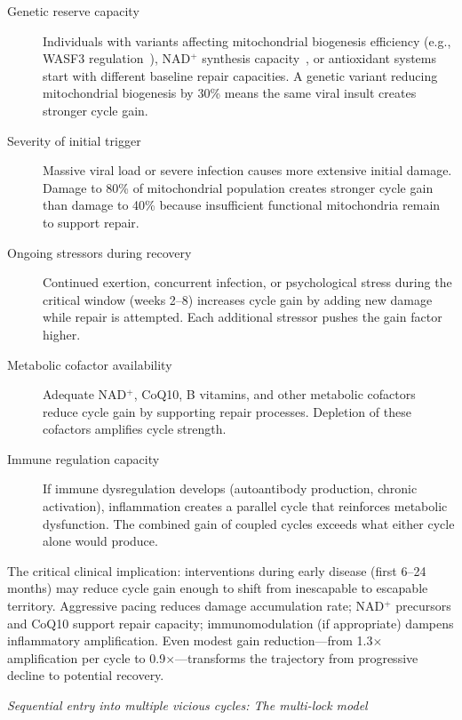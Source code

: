 \begin{description}
    \item[Genetic reserve capacity] Individuals with variants affecting mitochondrial biogenesis efficiency (e.g., WASF3 regulation~\cite{wang2023wasf3}), NAD$^+$ synthesis capacity~\cite{syed2025nad_therapy}, or antioxidant systems start with different baseline repair capacities. A genetic variant reducing mitochondrial biogenesis by 30\% means the same viral insult creates stronger cycle gain.

    \item[Severity of initial trigger] Massive viral load or severe infection causes more extensive initial damage. Damage to 80\% of mitochondrial population creates stronger cycle gain than damage to 40\% because insufficient functional mitochondria remain to support repair.

    \item[Ongoing stressors during recovery] Continued exertion, concurrent infection, or psychological stress during the critical window (weeks 2--8) increases cycle gain by adding new damage while repair is attempted. Each additional stressor pushes the gain factor higher.

    \item[Metabolic cofactor availability] Adequate NAD$^+$, CoQ10, B vitamins, and other metabolic cofactors reduce cycle gain by supporting repair processes. Depletion of these cofactors amplifies cycle strength.

    \item[Immune regulation capacity] If immune dysregulation develops (autoantibody production, chronic activation), inflammation creates a parallel cycle that reinforces metabolic dysfunction. The combined gain of coupled cycles exceeds what either cycle alone would produce.
\end{description}

The critical clinical implication: interventions during early disease (first 6--24 months) may reduce cycle gain enough to shift from inescapable to escapable territory. Aggressive pacing reduces damage accumulation rate; NAD$^+$ precursors and CoQ10 support repair capacity; immunomodulation (if appropriate) dampens inflammatory amplification. Even modest gain reduction---from 1.3$\times$ amplification per cycle to 0.9$\times$---transforms the trajectory from progressive decline to potential recovery.

\textit{Sequential entry into multiple vicious cycles: The multi-lock model}

